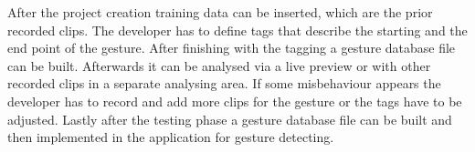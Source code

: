 After the project creation training data can be inserted, which are the prior recorded clips. The developer has to define tags that describe the starting and the end point of the gesture. After finishing with the tagging a gesture database file can be built. Afterwards it can be analysed via a live preview or with other recorded clips in a separate analysing area. If some misbehaviour appears the developer has to record and add more clips for the gesture or the tags have to be adjusted. Lastly after the testing phase a gesture database file can be built and then implemented in the application for gesture detecting. %